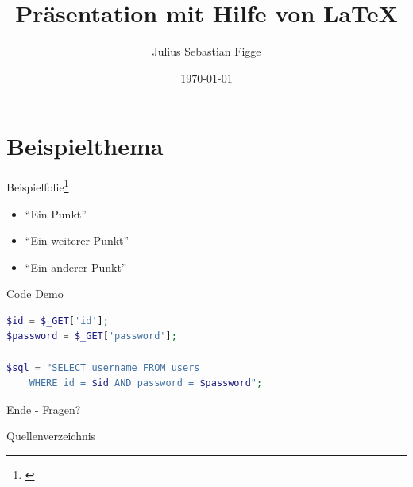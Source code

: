 \documentclass[xcolor=dvipsnames,11pt]{beamer}
\author{Julius Sebastian Figge}
\title[FHDW Präsentation Template]{Präsentation mit Hilfe von \LaTeX}
\date{\today}
\begin{document}
\begin{frame}
\titlepage
\end{frame}

\frame{\tableofcontents}

\section{Beispielthema}

\begin{frame}{Beispielfolie\footnote{\cite{ExampleEntry}}}
\begin{itemize}
	\item \enquote{Ein Punkt}
	\item \enquote{Ein weiterer Punkt}
	\item \enquote{Ein anderer Punkt}
\end{itemize}
\end{frame}

\begin{frame}[fragile]{Code Demo}
	\begin{lstlisting}[language=PHP, title=PHP Pseudo Code]
$id = $_GET['id'];
$password = $_GET['password'];

$sql = "SELECT username FROM users
	WHERE id = $id AND password = $password";
	\end{lstlisting}
\end{frame}

\begin{frame}
\center \huge Ende - Fragen?
\end{frame}

\begin{frame}[allowframebreaks]{Quellenverzeichnis}
\tiny\printbibliography
\end{frame}
\end{document}
